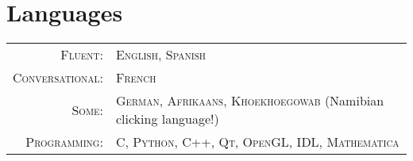 \documentclass[10pt]{article} %
\begin{document}

\section{Languages}

\begin{tabular}{rl}
\textsc{Fluent:} & \textsc{English}, \textsc{Spanish} \\
\textsc{Conversational:} & \textsc{French} \\
\textsc{Some:} & \textsc{German}, \textsc{Afrikaans}, \textsc{Khoekhoegowab} (Namibian clicking language!) \\
\textsc{Programming:} & \textsc{C, Python, C++, Qt, OpenGL, IDL, Mathematica} \\
\end{tabular}



\end{document}
